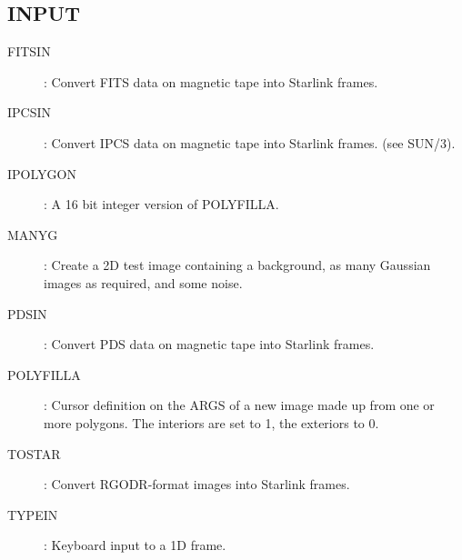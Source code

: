 \subsection {INPUT}
\begin{description}
\begin{description}
\item [FITSIN]: Convert FITS data on magnetic tape into Starlink frames.
\item [IPCSIN]: Convert IPCS data on magnetic tape into Starlink frames.
(see SUN/3).
\item [IPOLYGON]: A 16 bit integer version of POLYFILLA.
\item [MANYG]: Create a 2D test image containing a background, as many Gaussian
images as required, and some noise.
\item [PDSIN]: Convert PDS data on magnetic tape into Starlink frames.
\item [POLYFILLA]: Cursor definition on the ARGS of a new image made up from
one or more polygons.
The interiors are set to 1, the exteriors to 0.
\item [TOSTAR]: Convert RGODR-format images into Starlink frames.
\item [TYPEIN]: Keyboard input to a 1D frame.
\end{description}
\end{description}
